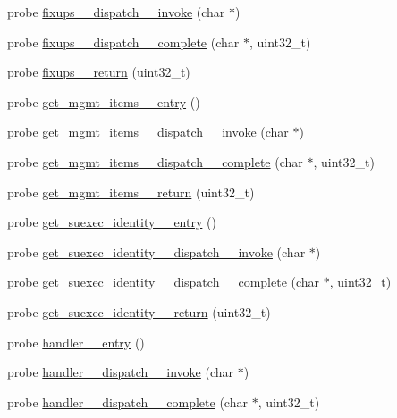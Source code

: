 \begin{DoxyCompactItemize}
\item 
probe \hyperlink{apache__probes_8d_a48a7d7a5840cdee4c5b9b5b8d6c8e3a3}{fixups\+\_\+\+\_\+dispatch\+\_\+\+\_\+invoke} (char $\ast$)
\item 
probe \hyperlink{apache__probes_8d_abe73f5e019f691c5eb5e323324843b46}{fixups\+\_\+\+\_\+dispatch\+\_\+\+\_\+complete} (char $\ast$, uint32\+\_\+t)
\item 
probe \hyperlink{apache__probes_8d_ae550b6a7d3a5929075f8ba0c28aedd9f}{fixups\+\_\+\+\_\+return} (uint32\+\_\+t)
\item 
probe \hyperlink{apache__probes_8d_a2632f8cc2c600f15fb944d054f9da05f}{get\+\_\+mgmt\+\_\+items\+\_\+\+\_\+entry} ()
\item 
probe \hyperlink{apache__probes_8d_a1cf78464d56c3d9dd1f7ef585c156639}{get\+\_\+mgmt\+\_\+items\+\_\+\+\_\+dispatch\+\_\+\+\_\+invoke} (char $\ast$)
\item 
probe \hyperlink{apache__probes_8d_a3c2dbdea5d004365fc6d9ffe41669089}{get\+\_\+mgmt\+\_\+items\+\_\+\+\_\+dispatch\+\_\+\+\_\+complete} (char $\ast$, uint32\+\_\+t)
\item 
probe \hyperlink{apache__probes_8d_a99f12f9c5f8ec7e3245d3dbb54d4c30e}{get\+\_\+mgmt\+\_\+items\+\_\+\+\_\+return} (uint32\+\_\+t)
\item 
probe \hyperlink{apache__probes_8d_ad6d8a7531b637704f58e948268c867ff}{get\+\_\+suexec\+\_\+identity\+\_\+\+\_\+entry} ()
\item 
probe \hyperlink{apache__probes_8d_ae073e23b4aa7f2543f790ef306a63ee5}{get\+\_\+suexec\+\_\+identity\+\_\+\+\_\+dispatch\+\_\+\+\_\+invoke} (char $\ast$)
\item 
probe \hyperlink{apache__probes_8d_a24c05d74ad7604be4d0805c75d571f91}{get\+\_\+suexec\+\_\+identity\+\_\+\+\_\+dispatch\+\_\+\+\_\+complete} (char $\ast$, uint32\+\_\+t)
\item 
probe \hyperlink{apache__probes_8d_a82b90f22e4da67b49b4de644aca98e7d}{get\+\_\+suexec\+\_\+identity\+\_\+\+\_\+return} (uint32\+\_\+t)
\item 
probe \hyperlink{apache__probes_8d_ab7d2738297acc8748e8f7c3bc1aaf95c}{handler\+\_\+\+\_\+entry} ()
\item 
probe \hyperlink{apache__probes_8d_af0d79bd4514b18243de95d01d16fdbf2}{handler\+\_\+\+\_\+dispatch\+\_\+\+\_\+invoke} (char $\ast$)
\item 
probe \hyperlink{apache__probes_8d_a66c6a135eb178a26a6acdb488877a612}{handler\+\_\+\+\_\+dispatch\+\_\+\+\_\+complete} (char $\ast$, uint32\+\_\+t)
\item 

\end{DoxyCompactItemize}
